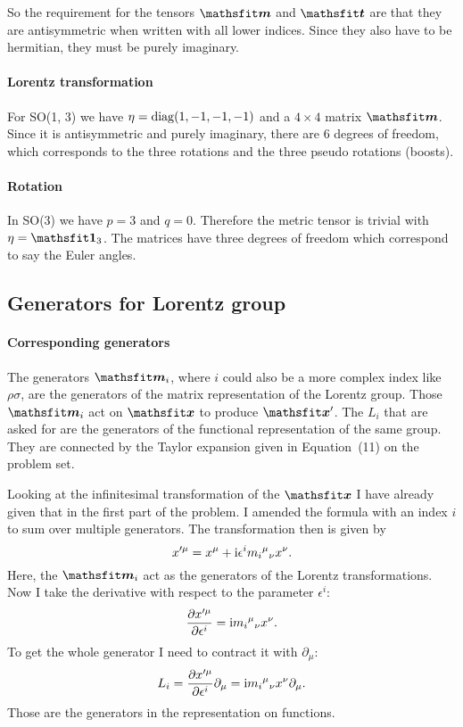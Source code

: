 \documentclass[11pt, english, fleqn, DIV=15, headinclude, BCOR=1cm]{scrartcl}
\begin{document}
So the requirement for the tensors $\tens m$ and $\tens t$ are that they are
antisymmetric when written with all lower indices. Since they also have to be
hermitian, they must be purely imaginary.

\paragraph{Lorentz transformation}

For SO(1, 3) we have $\eta = \operatorname{diag}(1, -1, -1, -1)$ and a $4\times 4$ matrix
$\tens m$. Since it is antisymmetric and purely imaginary, there are 6 degrees
of freedom, which corresponds to the three rotations and the three
pseudo rotations (boosts).

\paragraph{Rotation}

In SO(3) we have $p = 3$ and $q = 0$. Therefore the metric tensor is trivial
with $\eta = \tens 1_3$. The matrices have three degrees of freedom which
correspond to say the Euler angles.

\subsection{Generators for Lorentz group}

\paragraph{Corresponding generators}

The generators $\tens m_i$, where $i$ could also be a more complex index like
$\rho\sigma$, are the generators of the matrix representation of the Lorentz
group. Those $\tens m_i$ act on $\tens x$ to produce $\tens x'$. The $L_i$ that
are asked for are the generators of the functional representation of the same
group. They are connected by the Taylor expansion given in Equation~(11) on the
problem set.

Looking at the infinitesimal transformation of the $\tens x$ I have already
given that in the first part of the problem. I amended the formula with an
index $i$ to sum over multiple generators. The transformation then is given by
\[
    x'^\mu = x^\mu + \mathrm i \epsilon^i m_i{}^\mu{}_\nu x^\nu.
\]
Here, the $\tens m_i$ act as the generators of the Lorentz transformations. Now
I take the derivative with respect to the parameter $\epsilon^i$:
\[
    \frac{\partial {x'^\mu}}{\partial {\epsilon^i}} = \mathrm i m_i{}^\mu{}_\nu x^\nu.
\]
To get the whole generator I need to contract it with $\partial_\mu$:
\[
    L_i = \frac{\partial {x'^\mu}}{\partial {\epsilon^i}} \partial_\mu
    = \mathrm i m_i{}^\mu{}_\nu x^\nu \partial_\mu.
\]
Those are the generators in the representation on functions.
\end{document}
